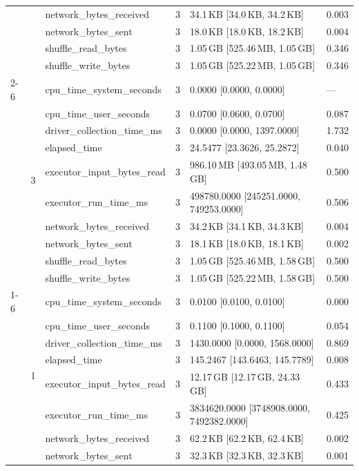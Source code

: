 \begin{tabular}{lllrll}
 &  & network_bytes_received & 3 & 34.1\,KB [34.0\,KB, 34.2\,KB] & 0.003 \\
 &  & network_bytes_sent & 3 & 18.0\,KB [18.0\,KB, 18.2\,KB] & 0.004 \\
 &  & shuffle_read_bytes & 3 & 1.05\,GB [525.46\,MB, 1.05\,GB] & 0.346 \\
 &  & shuffle_write_bytes & 3 & 1.05\,GB [525.22\,MB, 1.05\,GB] & 0.346 \\
\cline{2-6}
 & \multirow[t]{10}{*}{3} & cpu_time_system_seconds & 3 & 0.0000 [0.0000, 0.0000] & --- \\
 &  & cpu_time_user_seconds & 3 & 0.0700 [0.0600, 0.0700] & 0.087 \\
 &  & driver_collection_time_ms & 3 & 0.0000 [0.0000, 1397.0000] & 1.732 \\
 &  & elapsed_time & 3 & 24.5477 [23.3626, 25.2872] & 0.040 \\
 &  & executor_input_bytes_read & 3 & 986.10\,MB [493.05\,MB, 1.48\,GB] & 0.500 \\
 &  & executor_run_time_ms & 3 & 498780.0000 [245251.0000, 749253.0000] & 0.506 \\
 &  & network_bytes_received & 3 & 34.2\,KB [34.1\,KB, 34.3\,KB] & 0.004 \\
 &  & network_bytes_sent & 3 & 18.1\,KB [18.0\,KB, 18.1\,KB] & 0.002 \\
 &  & shuffle_read_bytes & 3 & 1.05\,GB [525.46\,MB, 1.58\,GB] & 0.500 \\
 &  & shuffle_write_bytes & 3 & 1.05\,GB [525.22\,MB, 1.58\,GB] & 0.500 \\
\cline{1-6} \cline{2-6}
\multirow[t]{30}{*}{national-scale-spatial-join-databricks-broadcast-8-nodes-large} & \multirow[t]{10}{*}{1} & cpu_time_system_seconds & 3 & 0.0100 [0.0100, 0.0100] & 0.000 \\
 &  & cpu_time_user_seconds & 3 & 0.1100 [0.1000, 0.1100] & 0.054 \\
 &  & driver_collection_time_ms & 3 & 1430.0000 [0.0000, 1568.0000] & 0.869 \\
 &  & elapsed_time & 3 & 145.2467 [143.6463, 145.7789] & 0.008 \\
 &  & executor_input_bytes_read & 3 & 12.17\,GB [12.17\,GB, 24.33\,GB] & 0.433 \\
 &  & executor_run_time_ms & 3 & 3834620.0000 [3748908.0000, 7492382.0000] & 0.425 \\
 &  & network_bytes_received & 3 & 62.2\,KB [62.2\,KB, 62.4\,KB] & 0.002 \\
 &  & network_bytes_sent & 3 & 32.3\,KB [32.3\,KB, 32.3\,KB] & 0.001 \\

\end{tabular}
